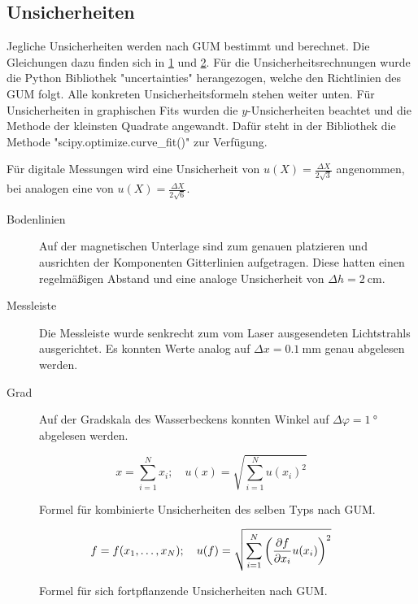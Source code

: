 \subsection{Unsicherheiten}\label{VGuD}

Jegliche Unsicherheiten werden nach GUM bestimmt und berechnet.
Die Gleichungen dazu finden sich in \ref{fig:GUM_combine} und \ref{fig:GUM_formula}.
Für die Unsicherheitsrechnungen wurde die Python Bibliothek "uncertainties" herangezogen, welche den Richtlinien des GUM folgt.
Alle konkreten Unsicherheitsformeln stehen weiter unten.
Für Unsicherheiten in graphischen Fits wurden die $y$-Unsicherheiten beachtet und die Methode der kleinsten Quadrate angewandt.
Dafür steht in der Bibliothek die Methode "scipy.optimize.curve\_fit()" zur Verfügung.

Für digitale Messungen wird eine Unsicherheit von $u(X) = \frac{\Delta X}{2\sqrt{3}}$ angenommen, bei analogen eine von $u(X) = \frac{\Delta X}{2\sqrt{6}}$.

\begin{description}
	\item[Bodenlinien] Auf der magnetischen Unterlage sind zum genauen platzieren und ausrichten der Komponenten Gitterlinien aufgetragen.
	Diese hatten einen regelmäßigen Abstand und eine analoge Unsicherheit von $\Delta h = \SI{2}{\centi\meter}$.
	
	\item[Messleiste] Die Messleiste wurde senkrecht zum vom Laser ausgesendeten Lichtstrahls ausgerichtet.
	Es konnten Werte analog auf $\Delta x = \SI{0.1}{\milli\meter}$ genau abgelesen werden.
	
	\item[Grad] Auf der Gradskala des Wasserbeckens konnten Winkel auf $\Delta \varphi = \SI{1}{\degree}$ abgelesen werden.
\end{description}

\begin{figure}[ht]
	\begin{equation*}
		x = \sum_{i=1}^{N} x_i
		;\quad
		u(x) = \sqrt{\sum_{i = 1}^{N} u(x_i)^2}
	\end{equation*}
	\caption{Formel für kombinierte Unsicherheiten des selben Typs nach GUM.}
	\label{fig:GUM_combine}
\end{figure}

\begin{figure}[ht]
	\begin{align*}
		f = f(x_1, \dots , x_N)
		;\quad
		u(f) = \sqrt{\sum_{i = 1}^{N}\left(\pdv{f}{x_i} u(x_i)\right) ^2}
	\end{align*}
	\caption{Formel für sich fortpflanzende Unsicherheiten nach GUM.}
	\label{fig:GUM_formula}
\end{figure}

